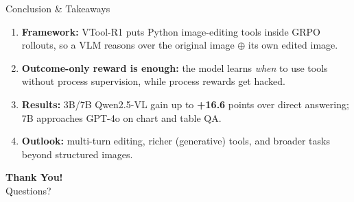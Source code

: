\documentclass[aspectratio=169]{beamer}
\begin{document}
\begin{frame}{Conclusion \& Takeaways}
  \begin{enumerate}
    \setlength{\itemsep}{0.45cm}
    \item \textbf{Framework:} VTool-R1 puts Python image-editing tools inside GRPO rollouts, so a VLM reasons over
          the original image $\oplus$ its own edited image.
    \item \textbf{Outcome-only reward is enough:} the model learns \emph{when} to use tools without process
          supervision, while process rewards get hacked.
    \item \textbf{Results:} 3B/7B Qwen2.5-VL gain up to \textcolor{medgreen}{\textbf{+16.6}} points over direct
          answering; 7B approaches GPT-4o on chart and table QA.
    \item \textbf{Outlook:} multi-turn editing, richer (generative) tools, and broader tasks beyond structured images.
  \end{enumerate}
  \vspace{0.5cm}
  \begin{center}
    \large \textbf{Thank You!}\\[0.1cm]
    \normalsize Questions?
  \end{center}
\end{frame}

\end{document}
